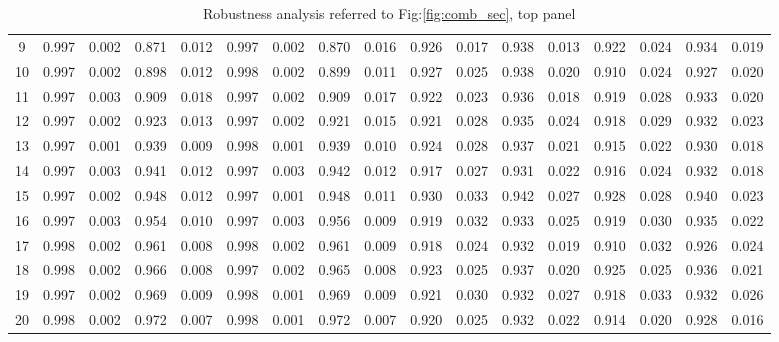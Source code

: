 \documentclass{article}
\begin{document}
\begin{table}[H]
{\begin{tabular}{|c|c|c|c|c|c|c|c|c|c|c|c|c|c|c|c|c|}
     9 & 0.997 & 0.002 & 0.871 & 0.012 & 0.997 & 0.002 & 0.870 & 0.016 & 0.926 & 0.017 & 0.938 & 0.013 & 0.922 & 0.024 & 0.934 & 0.019 \\ 
    10 & 0.997 & 0.002 & 0.898 & 0.012 & 0.998 & 0.002 & 0.899 & 0.011 & 0.927 & 0.025 & 0.938 & 0.020 & 0.910 & 0.024 & 0.927 & 0.020 \\ 
    11 & 0.997 & 0.003 & 0.909 & 0.018 & 0.997 & 0.002 & 0.909 & 0.017 & 0.922 & 0.023 & 0.936 & 0.018 & 0.919 & 0.028 & 0.933 & 0.020 \\ 
    12 & 0.997 & 0.002 & 0.923 & 0.013 & 0.997 & 0.002 & 0.921 & 0.015 & 0.921 & 0.028 & 0.935 & 0.024 & 0.918 & 0.029 & 0.932 & 0.023 \\ 
    13 & 0.997 & 0.001 & 0.939 & 0.009 & 0.998 & 0.001 & 0.939 & 0.010 & 0.924 & 0.028 & 0.937 & 0.021 & 0.915 & 0.022 & 0.930 & 0.018 \\ 
    14 & 0.997 & 0.003 & 0.941 & 0.012 & 0.997 & 0.003 & 0.942 & 0.012 & 0.917 & 0.027 & 0.931 & 0.022 & 0.916 & 0.024 & 0.932 & 0.018 \\ 
    15 & 0.997 & 0.002 & 0.948 & 0.012 & 0.997 & 0.001 & 0.948 & 0.011 & 0.930 & 0.033 & 0.942 & 0.027 & 0.928 & 0.028 & 0.940 & 0.023 \\ 
    16 & 0.997 & 0.003 & 0.954 & 0.010 & 0.997 & 0.003 & 0.956 & 0.009 & 0.919 & 0.032 & 0.933 & 0.025 & 0.919 & 0.030 & 0.935 & 0.022 \\ 
    17 & 0.998 & 0.002 & 0.961 & 0.008 & 0.998 & 0.002 & 0.961 & 0.009 & 0.918 & 0.024 & 0.932 & 0.019 & 0.910 & 0.032 & 0.926 & 0.024 \\ 
    18 & 0.998 & 0.002 & 0.966 & 0.008 & 0.997 & 0.002 & 0.965 & 0.008 & 0.923 & 0.025 & 0.937 & 0.020 & 0.925 & 0.025 & 0.936 & 0.021 \\ 
    19 & 0.997 & 0.002 & 0.969 & 0.009 & 0.998 & 0.001 & 0.969 & 0.009 & 0.921 & 0.030 & 0.932 & 0.027 & 0.918 & 0.033 & 0.932 & 0.026 \\ 
    20 & 0.998 & 0.002 & 0.972 & 0.007 & 0.998 & 0.001 & 0.972 & 0.007 & 0.920 & 0.025 & 0.932 & 0.022 & 0.914 & 0.020 & 0.928 & 0.016 \\ 
   \hline
\end{tabular}
}

\caption{Robustness analysis referred to Fig:\ref{fig:comb_sec}, top panel}
\label{tab:xxx}
\end{table} %
\end{document}
